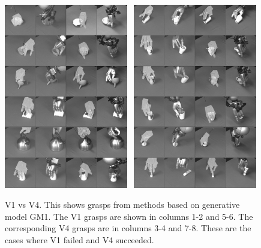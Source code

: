 \begin{figure}
\begin{center}
\includegraphics[width=0.48\textwidth]{plots/A2fA9s_1_vertical.jpg}~
\includegraphics[width=0.48\textwidth]{plots/A2fA9s_2_vertical.jpg}
\caption{V1 vs V4. This shows grasps from methods based on generative model GM1. The V1 grasps are shown in columns 1-2 and 5-6. The corresponding V4 grasps are in columns 3-4 and 7-8. These are the cases where V1 failed and V4 succeeded.\label{fig:v1fv4s}}
\end{center}
\end{figure}


